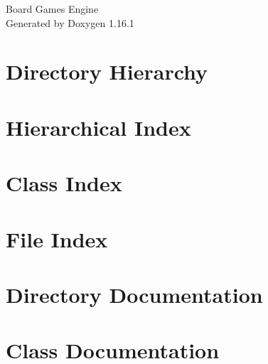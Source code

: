 \documentclass[twoside]{book}
\newcommand{\+}{\discretionary{\mbox{\scriptsize$\hookleftarrow$}}{}{}}
\newcommand{\clearemptydoublepage}{%
    \newpage{\pagestyle{empty}\cleardoublepage}%
  }
\begin{document}
  \raggedbottom
    \hypersetup{pageanchor=false,
                bookmarksnumbered=true,
                pdfencoding=unicode
               }
  \begin{titlepage}
  \vspace*{7cm}
  \begin{center}%
  {\Large Board Games Engine}\\
  \vspace*{1cm}
  {\large Generated by Doxygen 1.16.1}\\
  \end{center}
  \end{titlepage}
  \clearemptydoublepage
  \tableofcontents
  \clearemptydoublepage
  \hypersetup{pageanchor=true}
\chapter{Directory Hierarchy}

\chapter{Hierarchical Index}

\chapter{Class Index}

\chapter{File Index}

\chapter{Directory Documentation}





\chapter{Class Documentation}

































\end{document}
